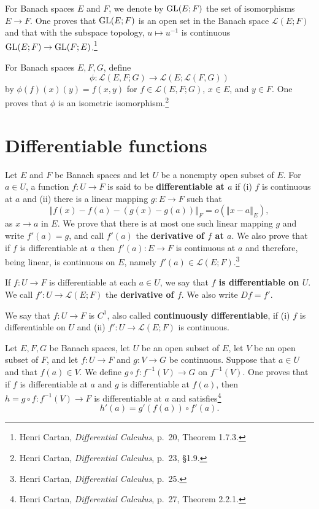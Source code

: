 \documentclass{article}
\newcommand{\GL}{\ensuremath\mathrm{GL}}
\newcommand{\norm}[1]{\left\Vert #1 \right\Vert}
\theoremstyle{definition}
\begin{document}
For Banach spaces $E$ and $F$,
we denote by $\GL(E;F)$ the set of isomorphisms $E \to F$. One proves that $\GL(E;F)$ is an open set in the Banach space
$\mathscr{L}(E;F)$ and that with the subspace topology, $u \mapsto u^{-1}$ is continuous $\GL(E;F) \to \GL(F;E)$.\footnote{Henri Cartan, {\em Differential Calculus}, p.~20, Theorem 1.7.3.}


For Banach spaces $E,F,G$, define
\[
\phi:\mathscr{L}(E,F;G) \to \mathscr{L}(E;\mathscr{L}(F,G))
\]
by $\phi(f)(x)(y) = f(x,y)$ for $f \in \mathscr{L}(E,F;G)$, $x \in E$, and $y \in F$. One proves that
$\phi$ is an isometric isomorphism.\footnote{Henri Cartan, {\em Differential Calculus}, p.~23, \S 1.9.}


\section{Differentiable functions}
Let $E$ and $F$ be Banach spaces and  let $U$ be a nonempty open subset of $E$.
For $a \in U$, a function $f:U \to F$  is said to be \textbf{differentiable at $a$} if (i) $f$ is continuous at $a$ and (ii)
there is a linear mapping $g:E \to F$ such that
\[
\norm{f(x)-f(a)-(g(x)-g(a))}_F = o(\norm{x-a}_E),
\]
as $x \to a$ in $E$. 
We prove that there is at most one such linear mapping $g$ and write $f'(a)=g$, and call $f'(a)$ the \textbf{derivative of $f$ at $a$}.
 We also prove that
if $f$ is differentiable at $a$ then $f'(a):E \to F$ is continuous at $a$ and therefore, being linear, is continuous on $E$, namely
$f'(a) \in \mathscr{L}(E;F)$.\footnote{Henri Cartan, {\em Differential Calculus}, p.~25.}

If $f:U \to F$ is differentiable at each $a \in U$, we say that \textbf{$f$ is differentiable on $U$}.
We call $f':U \to \mathscr{L}(E;F)$ the \textbf{derivative of $f$}. We also write $Df=f'$.

We say that $f:U \to F$ is $C^1$, also called \textbf{continuously differentiable}, if (i) $f$ is differentiable on $U$ and (ii) $f':U \to \mathscr{L}(E;F)$ is continuous.

Let $E,F,G$ be Banach spaces, let $U$ be an open subset of $E$,  let $V$ be an open subset of $F$, and let
$f:U \to F$ and $g:V \to G$ be continuous. Suppose that $a \in U$ and that $f(a) \in V$. We define
$g \circ f:f^{-1}(V) \to G$ on $f^{-1}(V)$. One proves that if $f$ is differentiable at $a$ and $g$ is differentiable at $f(a)$, then
$h=g \circ f:f^{-1}(V) \to F$ is differentiable at $a$ and satisfies\footnote{Henri Cartan, {\em Differential Calculus}, p.~27, Theorem 2.2.1.}
\[
h'(a) = g'(f(a)) \circ f'(a).
\]
\end{document}
